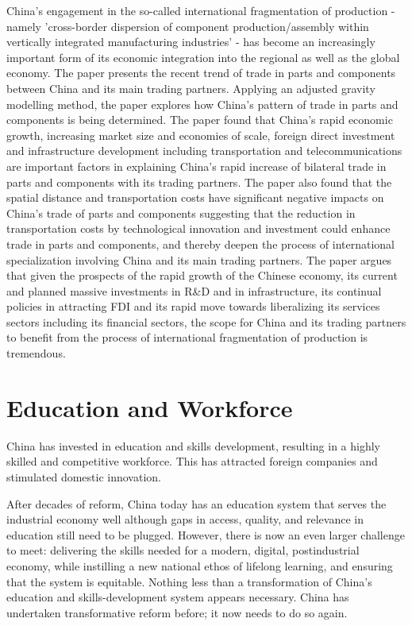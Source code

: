 China's engagement in the so-called international fragmentation of 
production - namely 'cross-border dispersion of component 
production/assembly within vertically integrated manufacturing 
industries' - has become an increasingly important form of its 
economic integration into the regional as well as the global 
economy. The paper presents the recent trend of trade in parts 
and components between China and its main trading partners. 
Applying an adjusted gravity modelling method, the paper explores 
how China's pattern of trade in parts and components is being 
determined. The paper found that China's rapid economic growth, 
increasing market size and economies of scale, foreign direct 
investment and infrastructure development including transportation 
and telecommunications are important factors in explaining China's 
rapid increase of bilateral trade in parts and components with its 
trading partners. The paper also found that the spatial distance 
and transportation costs have significant negative impacts on China's 
trade of parts and components suggesting that the reduction in 
transportation costs by technological innovation and investment 
could enhance trade in parts and components, and thereby deepen 
the process of international specialization involving China and 
its main trading partners. The paper argues that given the 
prospects of the rapid growth of the Chinese economy, its current 
and planned massive investments in R\&D and in infrastructure, its 
continual policies in attracting FDI and its rapid move towards 
liberalizing its services sectors including its financial sectors, 
the scope for China and its trading partners to benefit from the 
process of international fragmentation of production is tremendous.

\section{Education and Workforce}

China has invested in education and skills development, resulting 
in a highly skilled and competitive workforce. This has attracted 
foreign companies and stimulated domestic innovation.

After decades of reform, China today has an education system that 
serves the industrial economy well although gaps in access, quality, 
and relevance in education still need to be plugged. However, there 
is now an even larger challenge to meet: delivering the skills needed 
for a modern, digital, postindustrial economy, while instilling a 
new national ethos of lifelong learning, and ensuring that the system 
is equitable. Nothing less than a transformation of China's education 
and skills-development system appears necessary. China has undertaken 
transformative reform before; it now needs to do so again.

